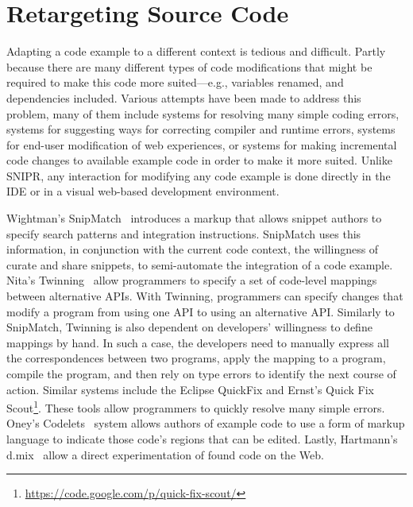 \section{Retargeting Source Code}
\label{sec:retargetingcode}

Adapting a code example to a different context is tedious and difficult. Partly because there are many different types of code modifications that might be required to make this code more suited---e.g., variables renamed, and dependencies included. Various attempts have been made to address this problem, many of them include systems for resolving many simple coding errors, systems for suggesting ways for correcting compiler and runtime errors, systems for end-user modification of web experiences, or systems for making incremental code changes to available example code in order to make it more suited. Unlike \uppercase{SnipR}, any interaction for modifying any code example is done directly in the IDE or in a visual web-based development environment.  

Wightman's SnipMatch~\cite{Wightman:2012gc} introduces a markup that allows snippet authors to specify search patterns and integration instructions. SnipMatch uses this information, in conjunction with the current code context, the willingness of curate and share snippets, to semi-automate the integration of a code example. Nita's Twinning~\cite{Nita:2010en} allow programmers to specify a set of code-level mappings between alternative APIs. With Twinning, programmers can specify changes that modify a program from using one API to using an alternative API. Similarly to SnipMatch, Twinning is also dependent on developers' willingness to define mappings by hand. In such a case, the developers need to manually express all the correspondences between two programs, apply the mapping to a program, compile the program, and then rely on type errors to identify the next course of action.  Similar systems include the Eclipse QuickFix and Ernst's Quick Fix Scout\footnote{\url{https://code.google.com/p/quick-fix-scout/}}. These tools allow programmers to quickly resolve many simple errors. Oney's Codelets~\cite{Oney:2012ge} system allows authors of example code to use a form of markup language to indicate those code's regions that can be edited. Lastly, Hartmann's d.mix~\cite{Hartmann:2007wf} allow a direct experimentation of found code on the Web.

